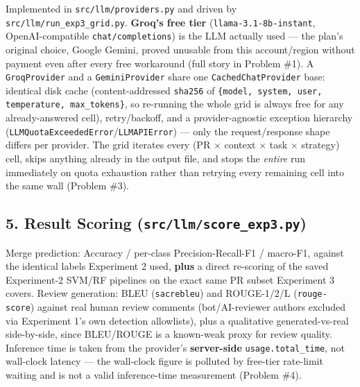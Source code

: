 \documentclass{experimentreport}
\begin{document}
{Implemented in \texttt{src/llm/providers.py} and driven by \texttt{src/llm/run\_exp3\_grid.py}.
\textbf{Groq's free tier} (\texttt{llama-3.1-8b-instant}, OpenAI-compatible \texttt{chat/completions})
is the LLM actually used --- the plan's original choice, Google Gemini, proved unusable from this
account/region without payment even after every free workaround (full story in Problem \#1). A
\texttt{GroqProvider} and a \texttt{GeminiProvider} share one \texttt{CachedChatProvider} base:
identical disk cache (content-addressed \texttt{sha256} of \texttt{\{model, system, user,
temperature, max\_tokens\}}, so re-running the whole grid is always free for any already-answered
cell), retry/backoff, and a provider-agnostic exception hierarchy
(\texttt{LLMQuotaExceededError}/\texttt{LLMAPIError}) --- only the request/response shape differs
per provider. The grid iterates every (PR $\times$ context $\times$ task $\times$ strategy) cell,
skips anything already in the output file, and stops the \emph{entire} run immediately on quota
exhaustion rather than retrying every remaining cell into the same wall (Problem \#3).

\subsection*{5. Result Scoring (\texttt{src/llm/score\_exp3.py})}

Merge prediction: Accuracy / per-class Precision-Recall-F1 / macro-F1, against the identical labels
Experiment 2 used, \textbf{plus} a direct re-scoring of the saved Experiment-2 SVM/RF pipelines on
the exact same PR subset Experiment 3 covers. Review generation: BLEU (\texttt{sacrebleu}) and
ROUGE-1/2/L (\texttt{rouge-score}) against real human review comments (bot/AI-reviewer authors
excluded via Experiment 1's own detection allowlists), plus a qualitative generated-vs-real
side-by-side, since BLEU/ROUGE is a known-weak proxy for review quality. Inference time is taken
from the provider's \textbf{server-side} \texttt{usage.total\_time}, not wall-clock latency --- the
wall-clock figure is polluted by free-tier rate-limit waiting and is not a valid inference-time
measurement (Problem \#4).

}

\end{document}
